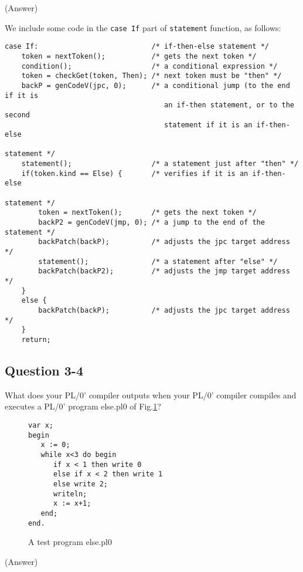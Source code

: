 \documentclass{article}
\begin{document}
\ifreport
(Answer)\\
\fi

We include some code in the {\tt case If} part of {\tt statement} function, as
follows:

\begin{verbatim}
case If:                           /* if-then-else statement */
    token = nextToken();           /* gets the next token */
    condition();                   /* a conditional expression */
    token = checkGet(token, Then); /* next token must be "then" */
    backP = genCodeV(jpc, 0);      /* a conditional jump (to the end if it is
                                      an if-then statement, or to the second
                                      statement if it is an if-then-else
                                                                    statement */
    statement();                   /* a statement just after "then" */
    if(token.kind == Else) {       /* verifies if it is an if-then-else
                                                                    statement */
        token = nextToken();       /* gets the next token */
        backP2 = genCodeV(jmp, 0); /* a jump to the end of the statement */
        backPatch(backP);          /* adjusts the jpc target address */
        statement();               /* a statement after "else" */
        backPatch(backP2);         /* adjusts the jmp target address */
    }
    else {
        backPatch(backP);          /* adjusts the jpc target address */
    }   
    return;
\end{verbatim}


\subsection*{Question 3-4}
What does your PL/0' compiler outputs when your PL/0' compiler compiles
and executes a PL/0' program else.pl0 of Fig.\ref{fig:if-then-else}?

\clearpage

\begin{figure}[h]
\begin{verbatim}
var x;
begin
   x := 0;
   while x<3 do begin
      if x < 1 then write 0
      else if x < 2 then write 1
      else write 2;
      writeln;
      x := x+1;
   end;
end.
\end{verbatim}
\caption{A test program else.pl0}\label{fig:if-then-else}
\end{figure}


\ifreport
(Answer)\\
\fi
\end{document}
